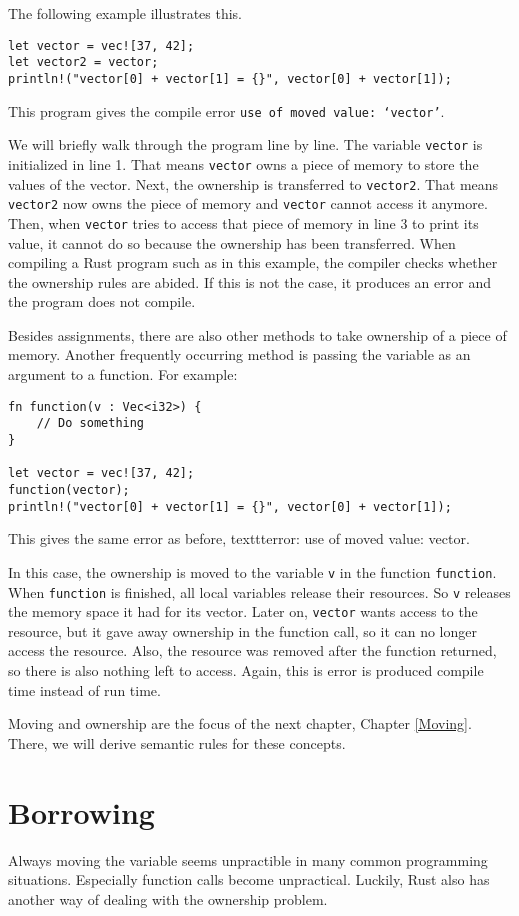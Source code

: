 The following example illustrates this. 
\begin{verbatim}
let vector = vec![37, 42];
let vector2 = vector;
println!("vector[0] + vector[1] = {}", vector[0] + vector[1]);
\end{verbatim}
This program gives the compile error \texttt{use of moved value: `vector'}. 

We will briefly walk through the program line by line. The variable \verb|vector| is initialized in line 1. That means \verb|vector| owns a piece of memory to store the values of the vector. Next, the ownership is transferred to \verb|vector2|. That means \verb|vector2| now owns the piece of memory and \verb|vector| cannot access it anymore. Then, when \verb|vector| tries to access that piece of memory in line 3 to print its value, it cannot do so because the ownership has been transferred. When compiling a Rust program such as in this example, the compiler checks whether the ownership rules are abided. If this is not the case, it produces an error and the program does not compile. 

Besides assignments, there are also other methods to take ownership of a piece of memory. Another frequently occurring method is passing the variable as an argument to a function. For example:

\begin{verbatim}
fn function(v : Vec<i32>) {
    // Do something
}

let vector = vec![37, 42];
function(vector);
println!("vector[0] + vector[1] = {}", vector[0] + vector[1]);
\end{verbatim}
This gives the same error as before, texttt{error: use of moved value: vector}. 

In this case, the ownership is moved to the variable \verb|v| in the function \texttt{function}. When \verb|function| is finished, all local variables release their resources. So \verb|v| releases the memory space it had for its vector. Later on, \verb|vector| wants access to the resource, but it gave away ownership in the function call, so it can no longer access the resource. Also, the resource was removed after the function returned, so there is also nothing left to access. Again, this is error is produced compile time instead of run time. 

Moving and ownership are the focus of the next chapter, Chapter \ref{Moving}. There, we will derive semantic rules for these concepts. 

\section{Borrowing}
Always moving the variable seems unpractible in many common programming situations. Especially function calls become unpractical. Luckily, Rust also has another way of dealing with the ownership problem. 


